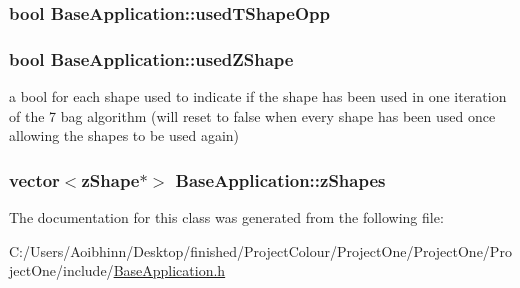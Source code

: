 \hypertarget{class_base_application_a0997587550f66c6425a2fae78f64e2b1}{
\subsubsection[{used\-T\-Shape\-Opp}]{\setlength{\rightskip}{0pt plus 5cm}bool Base\-Application\-::used\-T\-Shape\-Opp\hspace{0.3cm}{\ttfamily [protected]}}}\label{class_base_application_a0997587550f66c6425a2fae78f64e2b1}
\hypertarget{class_base_application_abde703d00837e1f9c80698e820529a95}{
\subsubsection[{used\-Z\-Shape}]{\setlength{\rightskip}{0pt plus 5cm}bool Base\-Application\-::used\-Z\-Shape\hspace{0.3cm}{\ttfamily [protected]}}}\label{class_base_application_abde703d00837e1f9c80698e820529a95}
a bool for each shape used to indicate if the shape has been used in one iteration of the 7 bag algorithm (will reset to false when every shape has been used once allowing the shapes to be used again) \hypertarget{class_base_application_aa412bf0f968f597ca1ab77738eafd5f5}{
\subsubsection[{z\-Shapes}]{\setlength{\rightskip}{0pt plus 5cm}vector$<${\bf z\-Shape}$\ast$$>$ Base\-Application\-::z\-Shapes\hspace{0.3cm}{\ttfamily [protected]}}}\label{class_base_application_aa412bf0f968f597ca1ab77738eafd5f5}


The documentation for this class was generated from the following file\-:\begin{DoxyCompactItemize}
\item 
C\-:/\-Users/\-Aoibhinn/\-Desktop/finished/\-Project\-Colour/\-Project\-One/\-Project\-One/\-Project\-One/include/\hyperlink{_base_application_8h}{Base\-Application.\-h}\end{DoxyCompactItemize}
